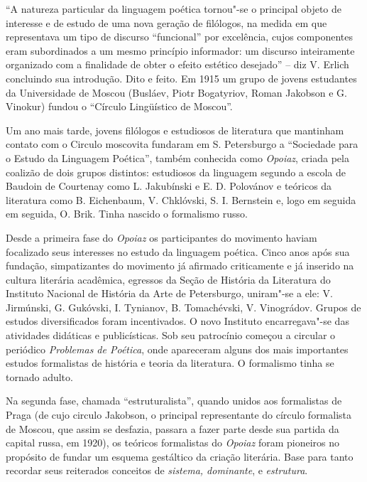 ``A natureza particular da linguagem poética tornou"-se o principal
objeto de interesse e de estudo de uma nova geração de filólogos, na
medida em que representava um tipo de discurso ``funcional'' por
excelência, cujos componentes eram subordinados a um mesmo princípio
informador: um discurso inteiramente organizado com a finalidade de
obter o efeito estético desejado'' -- diz V. Erlich concluindo sua
introdução. Dito e feito. Em 1915 um grupo de jovens estudantes da
Universidade de Moscou (Busláev, Piotr Bogatyriov, Roman Jakobson e G.
Vinokur) fundou o ``Círculo Lingüístico de Moscou''.

Um ano mais tarde, jovens filólogos e estudiosos de literatura que
mantinham contato com o Circulo moscovita fundaram em S. Petersburgo a
``Sociedade para o Estudo da Linguagem Poética'', também conhecida como
\emph{Opoiaz}, criada pela coalizão de dois grupos distintos: estudiosos
da linguagem segundo a escola de Baudoin de Courtenay como L. Jakubínski
e E. D. Polovánov e teóricos da literatura como B. Eichenbaum, V.
Chklóvski, S. I. Bernstein e, logo em seguida em seguida, O. Brik. Tinha
nascido o formalismo russo.

Desde a primeira fase do \emph{Opoiaz} os participantes do movimento
haviam focalizado seus interesses no estudo da linguagem poética. Cinco
anos após sua fundação, simpatizantes do movimento já afirmado
criticamente e já inserido na cultura literária acadêmica, egressos da
Seção de História da Literatura do Instituto Nacional de História da
Arte de Petersburgo, uniram"-se a ele: V. Jirmúnski, G. Gukóvski, I.
Tynianov, B. Tomachévski, V. Vinográdov. Grupos de estudos
diversificados foram incentivados. O novo Instituto encarregava"-se das
atividades didáticas e publicísticas. Sob seu patrocínio começou a
circular o periódico \emph{Problemas de Poética}, onde apareceram alguns
dos mais importantes estudos formalistas de história e teoria da
literatura. O formalismo tinha se tornado adulto.

Na segunda fase, chamada ``estruturalista'', quando unidos aos
formalistas de Praga (de cujo circulo Jakobson, o principal
representante do círculo formalista de Moscou, que assim se desfazia,
passara a fazer parte desde sua partida da capital russa, em 1920), os
teóricos formalistas do \emph{Opoiaz} foram pioneiros no propósito de
fundar um esquema gestáltico da criação literária. Base para tanto
recordar seus reiterados conceitos de \emph{sistema, dominante}, e
\emph{estrutura}.

